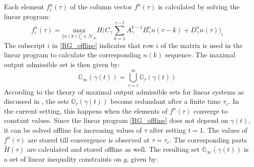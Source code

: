 \documentclass[letterpaper, 10 pt, conference]{ieeeconf}  %
\begin{document}
	Each element $f^n_i(\tau)$ of the column vector $f^n(\tau)$ is calculated by solving the linear program:
	\begin{equation}
	f_i^n(\tau) = \underset{\{n(k)\}_{t}^{\tau}\in \mathcal{N}_{\infty}}{\text{max}} H\bigg(C_{\gamma}\sum\limits_{k=1}^{\tau - t}A_{\gamma}^{k-1}B^n_{\gamma}n(\tau-k) + D_{\gamma}^n n(\tau)\bigg)_i
	\label{RG_offline}
	\end{equation}
	The subscript $i$ in \eqref{RG_offline} indicates that row $i$ of the matrix is used in the linear program to calculate the corresponding $n(k)$ sequence. The maximal output admissible set is then given by:
	\begin{equation}
	\mathbb{O}_{\infty}(\gamma(t)) = \bigcup\limits_{\tau=t}^{\infty}\mathbb{O}_{\tau}(\gamma(t))
	\end{equation}
	 According to the theory of maximal output admissible sets for linear systems as discussed in \cite{83532}, the sets $\mathbb{O}_{\tau}(\gamma(t))$ become redundant after a finite time $\tau_c$. In the current setting, this happens when the elements of $f^n(\tau)$ converge to constant values.
	 Since the linear program \eqref{RG_offline} does not depend on $\gamma(t)$, it can be solved offline for increasing values of $\tau$ after setting $t=1$. The values of $f^n(\tau)$ are stored till convergence is observed at $\tau = \tau_c$. The corresponding parts $\tilde{H}(\tau)$ are calculated and stored offline as well. The resulting set $\mathbb{O}_{\infty}(\gamma(t))$ is a set of linear inequality constraints on $g$, given by:
\end{document}

